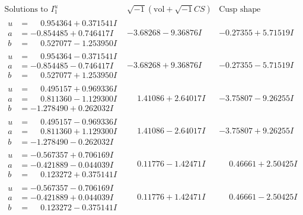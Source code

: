 \documentclass[1p]{elsarticle_modified}
\theoremstyle{definition}
\newcommand{\I}{\sqrt{-1}}
\begin{document}
$$\begin{array}{c|c|c}  
\text{Solutions to }I^u_{1}& \I (\text{vol} + \sqrt{-1}CS) & \text{Cusp shape}\\
 \hline 
\begin{aligned}
u &= \phantom{-}0.954364 + 0.371541 I \\
a &= -0.854485 + 0.746417 I \\
b &= \phantom{-}0.527077 - 1.253950 I\end{aligned}
 & -3.68268 - 9.36876 I & -0.27355 + 5.71519 I \\ \hline\begin{aligned}
u &= \phantom{-}0.954364 - 0.371541 I \\
a &= -0.854485 - 0.746417 I \\
b &= \phantom{-}0.527077 + 1.253950 I\end{aligned}
 & -3.68268 + 9.36876 I & -0.27355 - 5.71519 I \\ \hline\begin{aligned}
u &= \phantom{-}0.495157 + 0.969336 I \\
a &= \phantom{-}0.811360 - 1.129300 I \\
b &= -1.278490 + 0.262032 I\end{aligned}
 & \phantom{-}1.41086 + 2.64017 I & -3.75807 - 9.26255 I \\ \hline\begin{aligned}
u &= \phantom{-}0.495157 - 0.969336 I \\
a &= \phantom{-}0.811360 + 1.129300 I \\
b &= -1.278490 - 0.262032 I\end{aligned}
 & \phantom{-}1.41086 - 2.64017 I & -3.75807 + 9.26255 I \\ \hline\begin{aligned}
u &= -0.567357 + 0.706169 I \\
a &= -0.421889 - 0.044039 I \\
b &= \phantom{-}0.123272 + 0.375141 I\end{aligned}
 & \phantom{-}0.11776 - 1.42471 I & \phantom{-}0.46661 + 2.50425 I \\ \hline\begin{aligned}
u &= -0.567357 - 0.706169 I \\
a &= -0.421889 + 0.044039 I \\
b &= \phantom{-}0.123272 - 0.375141 I\end{aligned}
 & \phantom{-}0.11776 + 1.42471 I & \phantom{-}0.46661 - 2.50425 I \\ \hline\begin{aligned}

\end{aligned}
\end{array}$$
\end{document}
